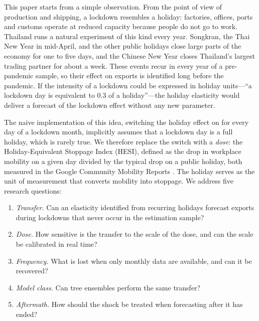 \documentclass{article}
\theoremstyle{plain}
\theoremstyle{definition}
\theoremstyle{remark}
\begin{document}
This paper starts from a simple observation. From the point of view of production and shipping, a lockdown resembles a holiday: factories, offices, ports and customs operate at reduced capacity because people do not go to work. Thailand runs a natural experiment of this kind every year. Songkran, the Thai New Year in mid-April, and the other public holidays close large parts of the economy for one to five days, and the Chinese New Year closes Thailand's largest trading partner for about a week. These events recur in every year of a pre-pandemic sample, so their effect on exports is identified long before the pandemic. If the intensity of a lockdown could be expressed in holiday units---``a lockdown day is equivalent to 0.3 of a holiday''---the holiday elasticity would deliver a forecast of the lockdown effect without any new parameter.

The naive implementation of this idea, switching the holiday effect on for every day of a lockdown month, implicitly assumes that a lockdown day is a full holiday, which is rarely true. We therefore replace the switch with a \emph{dose}: the Holiday-Equivalent Stoppage Index (HESI), defined as the drop in workplace mobility on a given day divided by the typical drop on a public holiday, both measured in the Google Community Mobility Reports \citep{google2022mobility}. The holiday serves as the unit of measurement that converts mobility into stoppage. We address five research questions:
\begin{enumerate}[label=\textbf{RQ\arabic*}, leftmargin=3.2em]
\item \emph{Transfer.} Can an elasticity identified from recurring holidays forecast exports during lockdowns that never occur in the estimation sample?
\item \emph{Dose.} How sensitive is the transfer to the scale of the dose, and can the scale be calibrated in real time?
\item \emph{Frequency.} What is lost when only monthly data are available, and can it be recovered?
\item \emph{Model class.} Can tree ensembles perform the same transfer?
\item \emph{Aftermath.} How should the shock be treated when forecasting after it has ended?
\end{enumerate}
\end{document}
